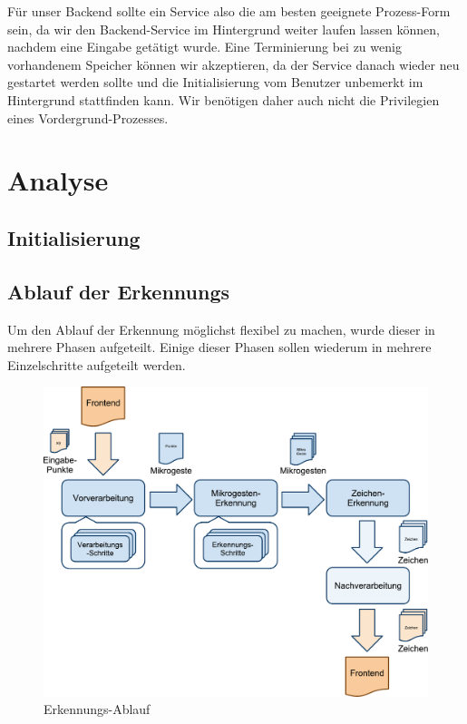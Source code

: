 Für unser Backend sollte ein Service also die am besten geeignete Prozess-Form sein, da wir den Backend-Service im Hintergrund weiter laufen lassen können, nachdem eine Eingabe getätigt wurde. Eine Terminierung bei zu wenig vorhandenem Speicher können wir akzeptieren, da der Service danach wieder neu gestartet werden sollte und die Initialisierung vom Benutzer unbemerkt im Hintergrund stattfinden kann. Wir benötigen daher auch nicht die Privilegien eines Vordergrund-Prozesses.

\section{Analyse}

\subsection{Initialisierung}

\subsection{Ablauf der Erkennungs}

Um den Ablauf der Erkennung möglichst flexibel zu machen, wurde dieser in mehrere Phasen aufgeteilt. Einige dieser Phasen sollen wiederum in mehrere Einzelschritte aufgeteilt werden.

\begin{figure}[h]
   \centering
   \includegraphics[width=\textwidth]{img/erkennungs_ablauf.pdf} 
   \caption{Erkennungs-Ablauf}
   \label{fig:erkennungs_ablauf}
\end{figure}

